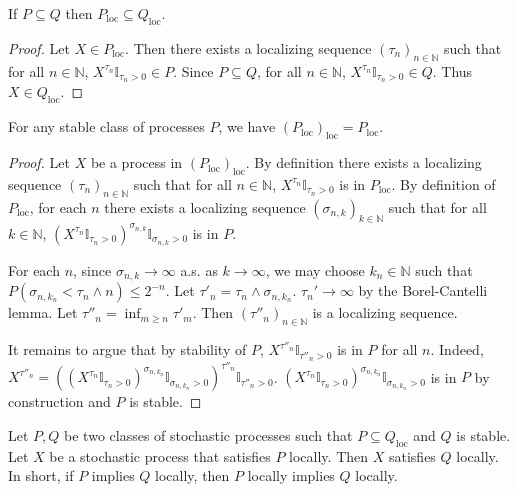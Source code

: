 \begin{lemma}\label{lem:locally_mono}
If $P \subseteq Q$ then $P_{\mathrm{loc}} \subseteq Q_{\mathrm{loc}}$.
\end{lemma}

\begin{proof}
Let $X \in P_{\mathrm{loc}}$.
Then there exists a localizing sequence $(\tau_n)_{n \in \mathbb{N}}$ such that for all $n \in \mathbb{N}$, $X^{\tau_n}\mathbb{I}_{\tau_n > 0} \in P$.
Since $P \subseteq Q$, for all $n \in \mathbb{N}$, $X^{\tau_n}\mathbb{I}_{\tau_n > 0} \in Q$.
Thus $X \in Q_{\mathrm{loc}}$.
\end{proof}


\begin{lemma}\label{lem:locally_locally}
For any stable class of processes $P$, we have $(P_{\mathrm{loc}})_{\mathrm{loc}} = P_{\mathrm{loc}}$.
\end{lemma}

\begin{proof}
Let $X$ be a process in $(P_{\mathrm{loc}})_{\mathrm{loc}}$.
By definition there exists a localizing sequence $(\tau_n)_{n \in \mathbb{N}}$ such that for all $n \in \mathbb{N}$, $X^{\tau_n}\mathbb{I}_{\tau_n > 0}$ is in $P_{\mathrm{loc}}$.
By definition of $P_{\mathrm{loc}}$, for each $n$ there exists a localizing sequence $(\sigma_{n,k})_{k \in \mathbb{N}}$ such that for all $k \in \mathbb{N}$, $(X^{\tau_n}\mathbb{I}_{\tau_n > 0})^{\sigma_{n,k}}\mathbb{I}_{\sigma_{n,k} > 0}$ is in $P$.

For each $n$, since $\sigma_{n,k} \to \infty$ a.s. as $k \to \infty$, we may choose $k_n \in \mathbb{N}$ such that $P(\sigma_{n,k_n} < \tau_n \wedge n) \le 2^{-n}$.
Let $\tau'_n = \tau_n \wedge \sigma_{n,k_n}$. $\tau_n' \to \infty$ by the Borel-Cantelli lemma.
Let $\tau''_n = \inf_{m \ge n} \tau'_m$.
Then $(\tau''_n)_{n \in \mathbb{N}}$ is a localizing sequence.

It remains to argue that by stability of $P$, $X^{\tau''_n}\mathbb{I}_{\tau''_n > 0}$ is in $P$ for all $n$.
Indeed, $X^{\tau''_n} = ((X^{\tau_n}\mathbb{I}_{\tau_n > 0})^{\sigma_{n,k_n}}\mathbb{I}_{\sigma_{n,k_n} > 0})^{\tau''_n}\mathbb{I}_{\tau''_n > 0}$. $(X^{\tau_n}\mathbb{I}_{\tau_n > 0})^{\sigma_{n,k_n}}\mathbb{I}_{\sigma_{n,k_n} > 0}$ is in $P$ by construction and $P$ is stable.
\end{proof}


\begin{lemma}\label{lem:local_induction}
Let $P, Q$ be two classes of stochastic processes such that $P \subseteq Q_{\mathrm{loc}}$ and $Q$ is stable.
Let $X$ be a stochastic process that satisfies $P$ locally.
Then $X$ satisfies $Q$ locally.
In short, if $P$ implies $Q$ locally, then $P$ locally implies $Q$ locally.
\end{lemma}

